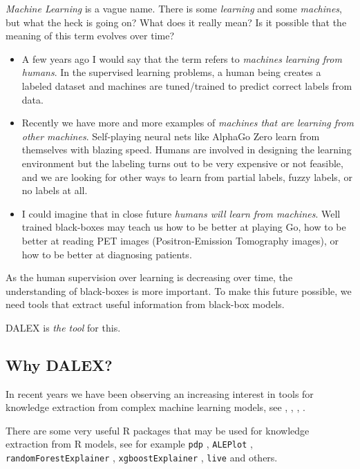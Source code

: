 \documentclass[]{book}
\providecommand{\tightlist}{%
  \setlength{\itemsep}{0pt}\setlength{\parskip}{0pt}}
\theoremstyle{definition}
\theoremstyle{definition}
\theoremstyle{definition}
\theoremstyle{remark}
\begin{document}
\emph{Machine Learning} is a vague name. There is some \emph{learning}
and some \emph{machines}, but what the heck is going on? What does it
really mean? Is it possible that the meaning of this term evolves over
time?

\begin{itemize}
\tightlist
\item
  A few years ago I would say that the term refers to \emph{machines
  learning from humans}. In the supervised learning problems, a human
  being creates a labeled dataset and machines are tuned/trained to
  predict correct labels from data.
\item
  Recently we have more and more examples of \emph{machines that are
  learning from other machines}. Self-playing neural nets like AlphaGo
  Zero \citep{AlphaGoZero} learn from themselves with blazing speed.
  Humans are involved in designing the learning environment but the
  labeling turns out to be very expensive or not feasible, and we are
  looking for other ways to learn from partial labels, fuzzy labels, or
  no labels at all.
\item
  I could imagine that in close future \emph{humans will learn from
  machines}. Well trained black-boxes may teach us how to be better at
  playing Go, how to be better at reading PET images (Positron-Emission
  Tomography images), or how to be better at diagnosing patients.
\end{itemize}

As the human supervision over learning is decreasing over time, the
understanding of black-boxes is more important. To make this future
possible, we need tools that extract useful information from black-box
models.

DALEX is \emph{the tool} for this.

\hypertarget{why-dalex}{%
\subsection{Why DALEX?}\label{why-dalex}}

In recent years we have been observing an increasing interest in tools
for knowledge extraction from complex machine learning models, see
\citep{Strumbelj}, \citep{nnet_vis}, \citep{magix},
\citep{Zeiler_Fergus_2014}.

There are some very useful R packages that may be used for knowledge
extraction from R models, see for example \texttt{pdp} \citep{pdp},
\texttt{ALEPlot} \citep{ALEPlot}, \texttt{randomForestExplainer}
\citep{randomForestExplainer}, \texttt{xgboostExplainer}
\citep{xgboostExplainer}, \texttt{live} \citep{live} and others.
\end{document}
